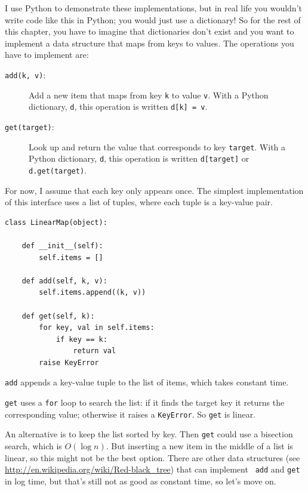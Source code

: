 \documentclass[10pt]{book}
\begin{document}
I use Python to demonstrate these implementations, but in real
life you wouldn't write code like this in Python; you would just use a
dictionary!  So for the rest of this chapter, you have to imagine that
dictionaries don't exist and you want to implement a data structure
that maps from keys to values.  The operations you have to
implement are:

\begin{description}

\item[{\tt add(k, v)}:] Add a new item that maps from key {\tt k}
to value {\tt v}.  With a Python dictionary, {\tt d}, this operation
is written {\tt d[k] = v}.

\item[{\tt get(target)}:] Look up and return the value that corresponds
to key {\tt target}.  With a Python dictionary, {\tt d}, this operation
is written {\tt d[target]} or {\tt d.get(target)}.

\end{description}

For now, I assume that each key only appears once.
The simplest implementation of this interface uses a list of
tuples, where each tuple is a key-value pair.

\begin{verbatim}
class LinearMap(object):

    def __init__(self):
        self.items = []

    def add(self, k, v):
        self.items.append((k, v))

    def get(self, k):
        for key, val in self.items:
            if key == k:
                return val
        raise KeyError
\end{verbatim}

{\tt add} appends a key-value tuple to the list of items, which
takes constant time.

{\tt get} uses a {\tt for} loop to search the list:
if it finds the target key it returns the corresponding value;
otherwise it raises a {\tt KeyError}.
So {\tt get} is linear.

An alternative is to keep the list sorted by key.  Then {\tt get}
could use a bisection search, which is $O(\log n)$.  But inserting a
new item in the middle of a list is linear, so this might not be the
best option.  There are other data structures (see
  \url{http://en.wikipedia.org/wiki/Red-black_tree})  that can implement {\tt
  add} and {\tt get} in log time, but that's still not as good as
constant time, so let's move on.
\end{document}
